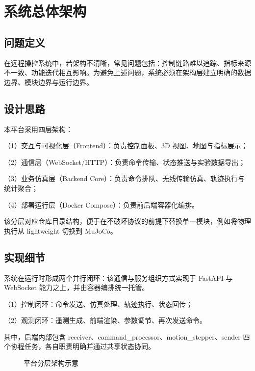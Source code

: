 
\section{系统总体架构}

\subsection{问题定义}
在远程操控系统中，若架构不清晰，常见问题包括：控制链路难以追踪、指标来源不一致、功能迭代相互影响。为避免上述问题，系统必须在架构层建立明确的数据边界、模块边界与运行边界。

\subsection{设计思路}
本平台采用四层架构：

（1）交互与可视化层（Frontend）：负责控制面板、3D 视图、地图与指标展示；

（2）通信层（WebSocket/HTTP）：负责命令传输、状态推送与实验数据导出；

（3）业务仿真层（Backend Core）：负责命令排队、无线传输仿真、轨迹执行与统计聚合；

（4）部署运行层（Docker Compose）：负责前后端容器化编排。

该分层对应仓库目录结构，便于在不破坏协议的前提下替换单一模块，例如将物理执行从 lightweight 切换到 MuJoCo。

\subsection{实现细节}
系统在运行时形成两个并行闭环：该通信与服务组织方式实现于 FastAPI 与 WebSocket 能力之上\cite{fastapi_docs}，并由容器编排统一托管\cite{docker_compose_docs}。

（1）控制闭环：命令发送、仿真处理、轨迹执行、状态回传；

（2）观测闭环：遥测生成、前端渲染、参数调节、再次发送命令。

其中，后端内部包含 receiver、command\_processor、motion\_stepper、sender 四个协程任务，各自职责明确并通过共享状态协同。

\begin{figure}[htbp]
\centering
{}
\caption{平台分层架构示意}
\label{fig:arch-layered}
\end{figure}

